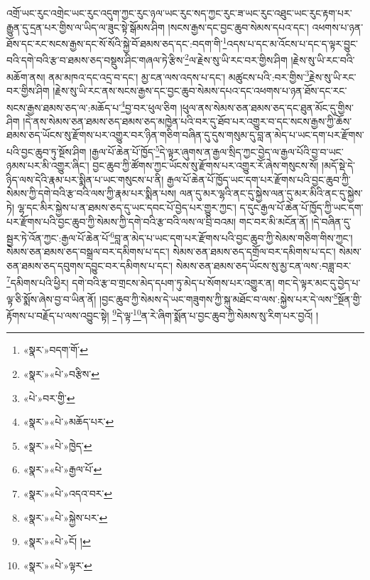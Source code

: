 འགྲོ་ཡང་རུང་འགྲེང་ཡང་རུང་འདུག་ཀྱང་རུང་ཉལ་ཡང་རུང་སད་ཀྱང་རུང་ཟ་ཡང་རུང་འཐུང་ཡང་རུང་རྟག་པར་རྒྱུན་དུ་དྲན་པར་གྱིས་ལ་ཡིད་ལ་ཟུང་སྟེ་སྒོམས་ཤིག །སངས་རྒྱས་དང་བྱང་ཆུབ་སེམས་དཔའ་དང་། འཕགས་པ་ཉན་ཐོས་དང་རང་སངས་རྒྱས་དང་སོ་སོའི་སྐྱེ་བོ་ཐམས་ཅད་དང་:བདག་གི་\footnote{«སྣར་»བདག་གོ་}འདས་པ་དང་མ་འོངས་པ་དང་ད་ལྟར་བྱུང་བའི་དགེ་བའི་རྩ་བ་ཐམས་ཅད་བསྡུས་ཤིང་གཞལ་ཏེ་རྩིས་\footnote{«སྣར་»«པེ་»བརྩིས་}ལ་རྗེས་སུ་ཡི་རང་བར་གྱིས་ཤིག །རྗེས་སུ་ཡི་རང་བའི་མཆོག་ནས། ནམ་མཁའ་དང་འདྲ་བ་དང་། མྱ་ངན་ལས་འདས་པ་དང་། མཚུངས་པའི་:བར་གྱིས་\footnote{«པེ་»བར་གྱི་}རྗེས་སུ་ཡི་རང་བར་གྱིས་ཤིག །རྗེས་སུ་ཡི་རང་ནས་སངས་རྒྱས་དང་བྱང་ཆུབ་སེམས་དཔའ་དང་འཕགས་པ་ཉན་ཐོས་དང་རང་སངས་རྒྱས་ཐམས་ཅད་ལ་:མཆོད་པ་\footnote{«སྣར་»«པེ་»མཆོད་པར་}བྱ་བར་ཕུལ་ཅིག །ཕུལ་ནས་སེམས་ཅན་ཐམས་ཅད་དང་ཐུན་མོང་དུ་གྱིས་ཤིག །དེ་ནས་སེམས་ཅན་ཐམས་ཅད་ཐམས་ཅད་མཁྱེན་པའི་བར་དུ་ཐོབ་པར་འགྱུར་བ་དང་སངས་རྒྱས་ཀྱི་ཆོས་ཐམས་ཅད་ཡོངས་སུ་རྫོགས་པར་འགྱུར་བར་ཉིན་གཅིག་བཞིན་དུ་དུས་གསུམ་དུ་བླ་ན་མེད་པ་ཡང་དག་པར་རྫོགས་པའི་བྱང་ཆུབ་ཏུ་སྔོས་ཤིག །རྒྱལ་པོ་ཆེན་པོ་ཁྱོད་\footnote{«སྣར་»«པེ་»ཁྱེད་}དེ་ལྟར་ཞུགས་ན་རྒྱལ་སྲིད་ཀྱང་བྱེད་ལ་རྒྱལ་པོའི་བྱ་བ་ཡང་ཉམས་པར་མི་འགྱུར་ཞིང་། བྱང་ཆུབ་ཀྱི་ཚོགས་ཀྱང་ཡོངས་སུ་རྫོགས་པར་འགྱུར་རོ་ཞེས་གསུངས་སོ། །མདོ་སྡེ་དེ་ཉིད་ལས་དེའི་རྣམ་པར་སྨིན་པ་ཡང་གསུངས་པ་ནི། རྒྱལ་པོ་ཆེན་པོ་ཁྱོད་ཡང་དག་པར་རྫོགས་པའི་བྱང་ཆུབ་ཀྱི་སེམས་ཀྱི་དགེ་བའི་རྩ་བའི་ལས་ཀྱི་རྣམ་པར་སྨིན་པས། ལན་དུ་མར་ལྷའི་ནང་དུ་སྐྱེས་ལན་དུ་མར་མིའི་ནང་དུ་སྐྱེས་ཏེ། ལྷ་དང་མིར་སྐྱེས་པ་ན་ཐམས་ཅད་དུ་ཡང་དབང་པོ་བྱེད་པར་གྱུར་ཀྱང་། ད་དུང་རྒྱལ་པོ་ཆེན་པོ་ཁྱོད་ཀྱི་ཡང་དག་པར་རྫོགས་པའི་བྱང་ཆུབ་ཀྱི་སེམས་ཀྱི་དགེ་བའི་རྩ་བའི་ལས་ལ་བྲི་བའམ། གང་བར་མི་མངོན་ནོ། །དེ་བཞིན་དུ་སྦྱར་ཏེ་འོན་ཀྱང་:རྒྱལ་པོ་ཆེན་པོ་\footnote{«སྣར་»«པེ་»རྒྱལ་པོ་}བླ་ན་མེད་པ་ཡང་དག་པར་རྫོགས་པའི་བྱང་ཆུབ་ཀྱི་སེམས་གཅིག་གིས་ཀྱང་། སེམས་ཅན་ཐམས་ཅད་བསྒྲལ་བར་དམིགས་པ་དང་། སེམས་ཅན་ཐམས་ཅད་དགྲོལ་བར་དམིགས་པ་དང་། སེམས་ཅན་ཐམས་ཅད་དབུགས་དབྱུང་བར་དམིགས་པ་དང་། སེམས་ཅན་ཐམས་ཅད་ཡོངས་སུ་མྱ་ངན་ལས་:བཟླ་བར་\footnote{«སྣར་»«པེ་»འདའ་བར་}དམིགས་པའི་ཕྱིར། དགེ་བའི་རྩ་བ་གྲངས་མེད་དཔག་ཏུ་མེད་པ་སོགས་པར་འགྱུར་ན། གང་དེ་ལྟར་མང་དུ་བྱེད་པ་ལྟ་ཅི་སྨོས་ཞེས་བྱ་བ་ཡིན་ནོ། །བྱང་ཆུབ་ཀྱི་སེམས་དེ་ཡང་གཟུགས་ཀྱི་སྐུ་མཐོང་བ་ལས་:སྐྱེས་པར་དེ་ལས་\footnote{«སྣར་»«པེ་»སྐྱེས་པར་}སྔོན་གྱི་རྟོགས་པ་བརྗོད་པ་ལས་འབྱུང་སྟེ། \footnote{«སྣར་»«པེ་»ངོ། ། }དེ་ལྟ་\footnote{«སྣར་»«པེ་»ལྟར་}ན་རེ་ཞིག་སྨོན་པ་བྱང་ཆུབ་ཀྱི་སེམས་སུ་རིག་པར་བྱའོ། །
